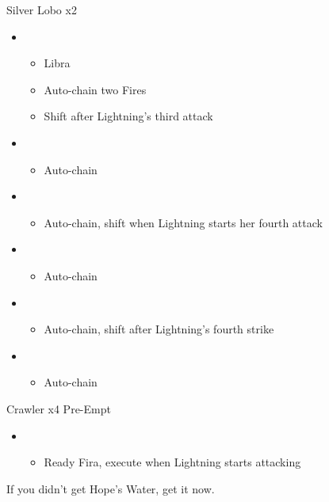 \begin{multicols}{2}
\begin{battle}{Silver Lobo x2}
\begin{itemize}
    \item \first
    \begin{itemize}
        \item Libra
        \item Auto-chain two Fires
        \item Shift after Lightning's third attack
    \end{itemize}
    \item \fourth
    \begin{itemize}
        \item Auto-chain
    \end{itemize}
    \item \sixth
    \begin{itemize}
        \item Auto-chain, shift when Lightning starts her fourth attack
    \end{itemize}
    \item \first
    \begin{itemize}
        \item Auto-chain
    \end{itemize}
    \item \fourth
    \begin{itemize}
        \item Auto-chain, shift after Lightning's fourth strike
    \end{itemize}
    \item \sixth
    \begin{itemize}
        \item Auto-chain
    \end{itemize}
\end{itemize}
\end{battle}
\vfill

\begin{battle}{Crawler x4 Pre-Empt}
\begin{itemize}
    \item \first
    \begin{itemize}
        \item Ready Fira, execute when Lightning starts attacking
    \end{itemize}
\end{itemize}
\end{battle}
If you didn't get Hope's Water, get it now.


\end{multicols}
